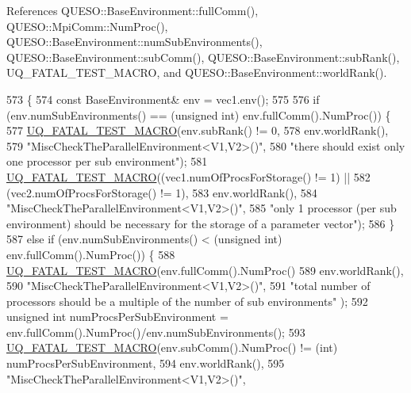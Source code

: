 References Q\-U\-E\-S\-O\-::\-Base\-Environment\-::full\-Comm(), Q\-U\-E\-S\-O\-::\-Mpi\-Comm\-::\-Num\-Proc(), Q\-U\-E\-S\-O\-::\-Base\-Environment\-::num\-Sub\-Environments(), Q\-U\-E\-S\-O\-::\-Base\-Environment\-::sub\-Comm(), Q\-U\-E\-S\-O\-::\-Base\-Environment\-::sub\-Rank(), U\-Q\-\_\-\-F\-A\-T\-A\-L\-\_\-\-T\-E\-S\-T\-\_\-\-M\-A\-C\-R\-O, and Q\-U\-E\-S\-O\-::\-Base\-Environment\-::world\-Rank().


\begin{DoxyCode}
573 \{
574   \textcolor{keyword}{const} BaseEnvironment& env = vec1.env();
575 
576   \textcolor{keywordflow}{if} (env.numSubEnvironments() == (\textcolor{keywordtype}{unsigned} int) env.fullComm().NumProc()) \{
577     \hyperlink{_defines_8h_a56d63d18d0a6d45757de47fcc06f574d}{UQ\_FATAL\_TEST\_MACRO}(env.subRank() != 0,
578                         env.worldRank(),
579                         \textcolor{stringliteral}{"MiscCheckTheParallelEnvironment<V1,V2>()"},
580                         \textcolor{stringliteral}{"there should exist only one processor per sub environment"});
581     \hyperlink{_defines_8h_a56d63d18d0a6d45757de47fcc06f574d}{UQ\_FATAL\_TEST\_MACRO}((vec1.numOfProcsForStorage() != 1) ||
582                         (vec2.numOfProcsForStorage() != 1),
583                         env.worldRank(),
584                         \textcolor{stringliteral}{"MiscCheckTheParallelEnvironment<V1,V2>()"},
585                         \textcolor{stringliteral}{"only 1 processor (per sub environment) should be necessary for the storage of a
       parameter vector"});
586   \}
587   \textcolor{keywordflow}{else} \textcolor{keywordflow}{if} (env.numSubEnvironments() < (\textcolor{keywordtype}{unsigned} int) env.fullComm().NumProc()) \{
588     \hyperlink{_defines_8h_a56d63d18d0a6d45757de47fcc06f574d}{UQ\_FATAL\_TEST\_MACRO}(env.fullComm().NumProc()%
589                         env.worldRank(),
590                         \textcolor{stringliteral}{"MiscCheckTheParallelEnvironment<V1,V2>()"},
591                         \textcolor{stringliteral}{"total number of processors should be a multiple of the number of sub environments"}
      );
592     \textcolor{keywordtype}{unsigned} \textcolor{keywordtype}{int} numProcsPerSubEnvironment = env.fullComm().NumProc()/env.numSubEnvironments();
593     \hyperlink{_defines_8h_a56d63d18d0a6d45757de47fcc06f574d}{UQ\_FATAL\_TEST\_MACRO}(env.subComm().NumProc() != (int) numProcsPerSubEnvironment,
594                         env.worldRank(),
595                         \textcolor{stringliteral}{"MiscCheckTheParallelEnvironment<V1,V2>()"},

\end{DoxyCode}
